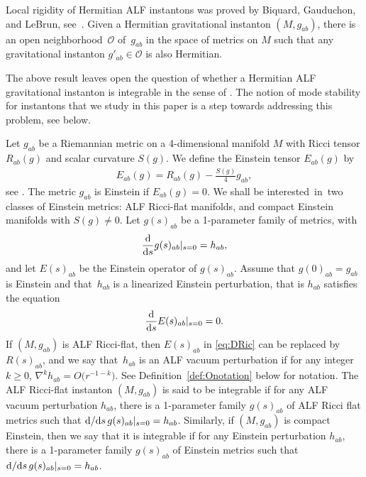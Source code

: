 \documentclass[10pt,a4paper]{amsart}
\numberwithin{equation}{section}
\begin{document}
Local rigidity of Hermitian ALF instantons was proved by Biquard, Gauduchon, and LeBrun, see~\cite{biquard2023gravitational}. Given a Hermitian gravitational instanton $(M, g_{ab})$, there is an open neighborhood~$\mathcal{O}$ of~$g_{ab}$ in the space of metrics on $M$ such that any gravitational instanton $g'_{ab} \in \mathcal{O}$ is also Hermitian.

\begin{Remark}%
The above result
leaves open the question of whether a Hermitian ALF gravitational instanton is integrable
in the sense of \cite[Section 12.E]{MR2371700}.
The notion of mode stability for instantons that we study in this paper is a step towards addressing this problem, see below.
\end{Remark}

Let $g_{ab}$ be a Riemannian metric on a 4-dimensional manifold $M$ with Ricci tensor $R_{ab}(g)$ and scalar curvature $S(g)$. We define the Einstein tensor $E_{ab}(g)$ by
\begin{align}\label{eq:EinsteinOp}
E_{ab}(g) = R_{ab}(g) - \frac{S(g)}{4}g_{ab},
\end{align}
see \cite[Section~12.26]{MR2371700}. The metric $g_{ab}$ is Einstein if $E_{ab}(g)=0$. We shall be interested~in~two classes of Einstein metrics: ALF Ricci-flat manifolds, and compact Einstein manifolds with ${S(g)\neq 0}$. Let $g(s)_{ab}$ be a 1-parameter family of metrics, with
\begin{align} \label{eq:LinMetric}
\frac{{\rm d}}{{\rm d}s} g(s)_{ab} |_{s=0} = h_{ab},
\end{align}
and let $E(s)_{ab}$ be the Einstein operator of $g(s)_{ab}$. Assume that $g(0)_{ab}=g_{ab}$ is Einstein and that~$h_{ab}$ is a linearized Einstein perturbation, that is $h_{ab}$ satisfies the equation
\begin{align} \label{eq:DRic}
\frac{{\rm d}}{{\rm d}s} E(s)_{ab}|_{s=0} = 0.
\end{align}
If $(M,g_{ab})$ is ALF Ricci-flat, then $E(s)_{ab}$ in \eqref{eq:DRic} can be replaced by $R(s)_{ab}$, and we say that~$h_{ab}$ is an ALF vacuum perturbation if for any integer $k \geq 0$, $\nabla^k h_{ab} = O\bigl(r^{-1-k}\bigr)$. See Definition~\ref{def:Onotation} below for notation. The ALF Ricci-flat instanton $(M,g_{ab})$ is said to be integrable if for any ALF vacuum perturbation $h_{ab}$, there is a 1-parameter family $g(s)_{ab}$ of ALF Ricci flat metrics such that ${\rm d}/{\rm d}s \, g(s)_{ab} |_{s=0} = h_{ab}$.
Similarly, if $(M,g_{ab})$ is compact Einstein, then we say that it is integrable if for any Einstein perturbation $h_{ab}$, there is a 1-parameter family $g(s)_{ab}$ of Einstein metrics such that ${\rm d}/{\rm d}s \, g(s)_{ab}|_{s=0} = h_{ab}$.
\end{document}
